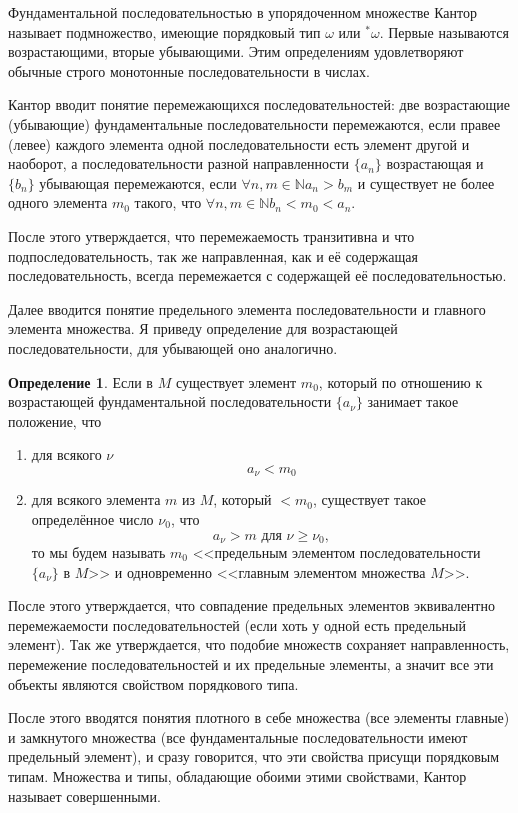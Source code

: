 \documentclass[a4paper,12pt]{extarticle}
\theoremstyle{definition}
\newtheorem{definition}{Определение}
\begin{document}
Фундаментальной последовательностью в упорядоченном множестве Кантор называет подмножество, имеющие порядковый тип $\omega$ или $^*\omega$.
Первые называются возрастающими, вторые убывающими.
Этим определениям удовлетворяют обычные строго монотонные последовательности в числах.

Кантор вводит понятие перемежающихся последовательностей: две возрастающие (убывающие) фундаментальные последовательности перемежаются,
если правее (левее) каждого элемента одной последовательности есть элемент другой и наоборот,
а последовательности разной направленности $\{a_n\}$ возрастающая и $\{b_n\}$ убывающая перемежаются,
если $\forall n, m \in \mathbb{N} a_n > b_m$ и существует не более одного элемента $m_0$ такого, что $\forall n, m \in \mathbb{N} b_n < m_0 < a_n$.

После этого утверждается, что перемежаемость транзитивна и что подпоследовательность, так же направленная, как и её содержащая последовательность,
всегда перемежается с содержащей её последовательностью.

Далее вводится понятие предельного элемента последовательности и главного элемента множества.
Я приведу определение для возрастающей последовательности, для убывающей оно аналогично.
\begin{definition}
    Если в $M$ существует элемент $m_0$, который по отношению к возрастающей фундаментальной последовательности $\{a_{\nu}\}$ занимает такое положение, что 
    \begin{enumerate}
        \item для всякого $\nu$ $$a_{\nu} < m_0$$
        \item для всякого элемента $m$ из $M$, который $< m_0$, существует такое определённое число $\nu_0$, что
            $$ a_{\nu} > m \text{ для } \nu \geqslant \nu_0,$$
            то мы будем называть $m_0$ <<предельным элементом последовательности $\{a_{\nu}\}$ в $M$>> и одновременно <<главным элементом множества $M$>>.
    \end{enumerate}
\end{definition}

После этого утверждается, что совпадение предельных элементов эквивалентно перемежаемости последовательностей (если хоть у одной есть предельный элемент).
Так же утверждается, что подобие множеств сохраняет направленность, перемежение последовательностей и их предельные элементы, а значит все эти объекты являются свойством порядкового типа.

После этого вводятся понятия плотного в себе множества (все элементы главные) и замкнутого множества (все фундаментальные последовательности имеют предельный элемент),
и сразу говорится, что эти свойства присущи порядковым типам.
Множества и типы, обладающие обоими этими свойствами, Кантор называет совершенными.
\end{document}
